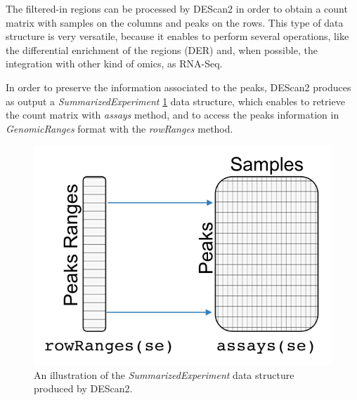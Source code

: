 The filtered-in regions can be processed by DEScan2 in order to obtain a count matrix with samples on the columns and peaks on the rows.
This type of data structure is very versatile, because it enables to perform several operations, like the differential enrichment of the regions (DER) and, when possible, the integration with other kind of omics, as RNA-Seq.

In order to preserve the information associated to the peaks, DEScan2 produces as output a \textit{SummarizedExperiment} \ref{fig:countsdescan} data structure, which enables to retrieve the count matrix with \textit{assays} method, and to access the peaks information in \textit{GenomicRanges} format with the \textit{rowRanges} method.

\begin{figure}[H]
\centering
\includegraphics[keepaspectratio]{img/descan2/counts.png}
\caption[DEScan2 counts illustration]{An illustration of the \textit{SummarizedExperiment} data structure produced by DEScan2.}
\label{fig:countsdescan}
\centering
\end{figure}





